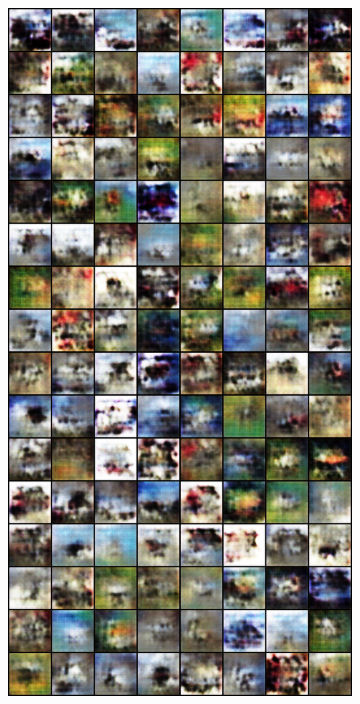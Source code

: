 \begin{figure}[H]
    \centering

    \begin{subfigure}{0.2\textwidth}
        \centering
        \includegraphics[width=0.95\linewidth]{cifar10/64_nz100/fake_sample_epoch_0005.png}
        \caption{}
        \label{subfig:cifar10/64_nz100/fake_sample_epoch_0005}

\end{subfigure}
\end{figure}
